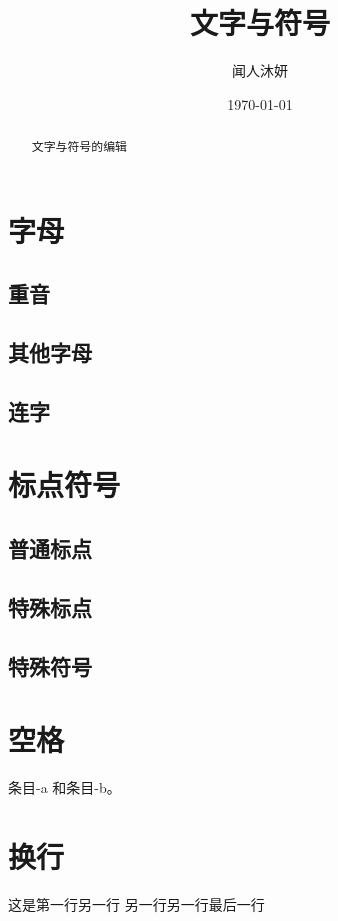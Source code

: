 \documentclass[UTF8]{ctexart}
\title{文字与符号}
\author{闻人沐妍}
\date{\today}
\begin{document}
    \maketitle

    \begin{abstract}
        文字与符号的编辑
    \end{abstract}

    \tableofcontents

    \section{字母}
        \subsection{重音}

        \subsection{其他字母}
        
        \subsection{连字}

    \section{标点符号}
        \subsection{普通标点}

        \subsection{特殊标点}

        \subsection{特殊符号}

    \section{空格}
        \mbox{条目}-a 和条目-b。

    \section{换行}
        这是第一行\linebreak[4]
        另一行\linebreak
        另一行\linebreak[2]
        另一行\linebreak[0]
        最后一行
\end{document}
